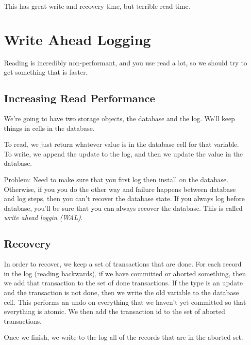 \documentclass[psamsfonts]{amsart}
\begin{document}
This has great write and recovery time, but terrible read time.

\section{Write Ahead Logging}

Reading is incredibly non-performant, and you use read a lot, so we should try to get something that is faster.

\subsection{Increasing Read Performance}

We're going to have two storage objects, the database and the log. We'll keep things in cells in the database.

To read, we just return whatever value is in the database cell for that variable. To write, we append the update to the log, and then we update the value in the database.

Problem: Need to make sure that you first log then install on the database. Otherwise, if you you do the other way and failure happens between database and log steps, then you can't recover the database state. If you always log before database, you'll be sure that you can always recover the database. This is called \emph{write ahead loggin (WAL)}.

\subsection{Recovery}

In order to recover, we keep a set of transactions that are done. For each record in the log (reading backwards), if we have committed or aborted something, then we add that transaction to the set of done transactions. If the type is an update and the transaction is not done, then we write the old variable to the database cell. This performs an undo on everything that we haven't yet committed so that everything is atomic. We then add the transaction id to the set of aborted transactions.

Once we finish, we write to the log all of the records that are in the aborted set.
\end{document}

